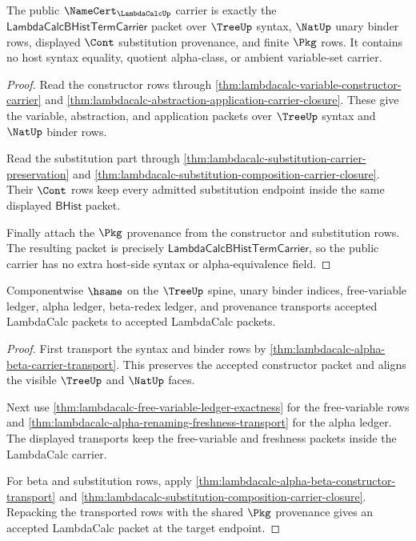 \begin{theorem}
\label{thm:lambdacalc-namecert-carrier-obligation}
The public $\NameCert_{\LambdaCalcUp}$ carrier is exactly the
$\mathsf{LambdaCalcBHistTermCarrier}$ packet over $\TreeUp$ syntax,
$\NatUp$ unary binder rows, displayed $\Cont$ substitution provenance, and
finite $\Pkg$ rows. It contains no host syntax equality, quotient
alpha-class, or ambient variable-set carrier.
\end{theorem}
\begin{proof}
Read the constructor rows through
\autoref{thm:lambdacalc-variable-constructor-carrier} and
\autoref{thm:lambdacalc-abstraction-application-carrier-closure}. These give
the variable, abstraction, and application packets over $\TreeUp$ syntax and
$\NatUp$ binder rows.

Read the substitution part through
\autoref{thm:lambdacalc-substitution-carrier-preservation} and
\autoref{thm:lambdacalc-substitution-composition-carrier-closure}. Their
$\Cont$ rows keep every admitted substitution endpoint inside the same
displayed $\mathsf{BHist}$ packet.

Finally attach the $\Pkg$ provenance from the constructor and substitution
rows. The resulting packet is precisely
$\mathsf{LambdaCalcBHistTermCarrier}$, so the public carrier has no extra
host-side syntax or alpha-equivalence field.
\end{proof}

\begin{theorem}
\label{thm:lambdacalc-namecert-classifier-stability}
Componentwise $\hsame$ on the $\TreeUp$ spine, unary binder indices,
free-variable ledger, alpha ledger, beta-redex ledger, and provenance
transports accepted LambdaCalc packets to accepted LambdaCalc packets.
\end{theorem}
\begin{proof}
First transport the syntax and binder rows by
\autoref{thm:lambdacalc-alpha-beta-carrier-transport}. This preserves the
accepted constructor packet and aligns the visible $\TreeUp$ and $\NatUp$
faces.

Next use
\autoref{thm:lambdacalc-free-variable-ledger-exactness} for the
free-variable rows and
\autoref{thm:lambdacalc-alpha-renaming-freshness-transport} for the alpha
ledger. The displayed transports keep the free-variable and freshness packets
inside the LambdaCalc carrier.

For beta and substitution rows, apply
\autoref{thm:lambdacalc-alpha-beta-constructor-transport} and
\autoref{thm:lambdacalc-substitution-composition-carrier-closure}. Repacking
the transported rows with the shared $\Pkg$ provenance gives an accepted
LambdaCalc packet at the target endpoint.
\end{proof}

